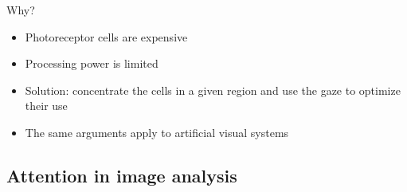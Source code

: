 \documentclass[xcolor=pdftex,dvipsnames,table,mathserif]{beamer}
\begin{document}
\begin{frame}{Why?}

  \begin{itemize}
  \item Photoreceptor cells are expensive
  \item Processing power is limited
  \item Solution: concentrate the cells in a given region and use the gaze to optimize their use
  \end{itemize}

\pause

  \begin{alertblock}{}
    \begin{itemize}
    \item The same arguments apply to artificial visual systems
    \end{itemize}
  \end{alertblock}

\end{frame}


\subsection{Attention in image analysis}
\end{document}
